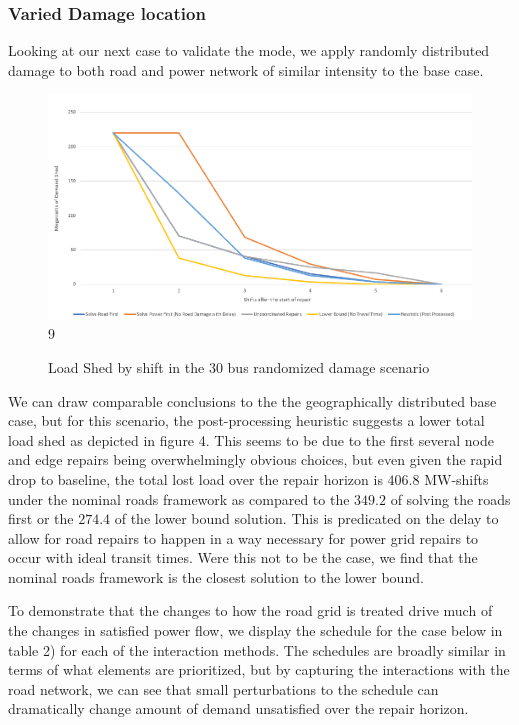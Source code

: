 \documentclass{article}
\begin{document}
	\subsubsection{Varied Damage location}
	Looking at our next case to validate the mode, we apply randomly distributed damage to both road and power network of similar intensity to the base case.
		\begin{figure}[H]
		\centering
		
		\centering
		\includegraphics[width=.9\linewidth]{Rplot30Rand.png}9
		\caption{Load Shed by shift in the 30 bus randomized damage scenario}
		\label{fig:sub1}
	\end{figure}

	We can draw comparable conclusions to the the geographically distributed base case, but for this scenario, the post-processing heuristic suggests a lower total load shed as depicted in figure 4. This seems to be due to the first several node and edge repairs being overwhelmingly obvious choices, but even given the rapid drop to baseline, the total lost load over the repair horizon is $406.8$ MW-shifts under the nominal roads framework as compared to the $349.2$ of solving the roads first or the $274.4$ of the lower bound solution. This is predicated on the delay to allow for road repairs to happen in a way necessary for power grid repairs to occur with ideal transit times. Were this not to be the case, we find that the nominal roads framework is the closest solution to the lower bound.
	
	To demonstrate that the changes to how the road grid is treated drive much of the changes in satisfied power flow, we display the schedule for the case below in table 2) for each of the interaction methods. The schedules are broadly similar in terms of what elements are prioritized, but by capturing the interactions with the road network, we can see that small perturbations to the schedule can dramatically change amount of demand unsatisfied over the repair horizon.
	
\end{document}
